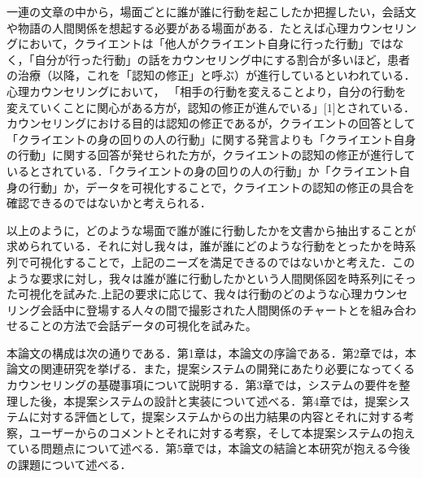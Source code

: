 \documentclass[shuuron]{kuee}
\begin{document}
一連の文章の中から，場面ごとに誰が誰に行動を起こしたか把握したい，会話文や物語の人間関係を想起する必要がある場面がある．たとえば心理カウンセリングにおいて，クライエントは「他人がクライエント自身に行った行動」ではなく，「自分が行った行動」の話をカウンセリング中にする割合が多いほど，患者の治療（以降，これを「認知の修正」と呼ぶ）が進行しているといわれている．心理カウンセリングにおいて， 「相手の行動を変えることより，自分の行動を変えていくことに関心がある方が，認知の修正が進んでいる」[1]とされている．カウンセリングにおける目的は認知の修正であるが，クライエントの回答として「クライエントの身の回りの人の行動」に関する発言よりも「クライエント自身の行動」に関する回答が発せられた方が，クライエントの認知の修正が進行しているとされている．「クライエントの身の回りの人の行動」か「クライエント自身の行動」か，データを可視化することで，クライエントの認知の修正の具合を確認できるのではないかと考えられる．

以上のように，どのような場面で誰が誰に行動したかを文書から抽出することが求められている．それに対し我々は，誰が誰にどのような行動をとったかを時系列で可視化することで，上記のニーズを満足できるのではないかと考えた．このような要求に対し，我々は誰が誰に行動したかという人間関係図を時系列にそった可視化を試みた.上記の要求に応じて、我々は行動のどのような心理カウンセリング会話中に登場する人々の間で撮影された人間関係のチャートとを組み合わせることの方法で会話データの可視化を試みた。

本論文の構成は次の通りである．第1章は，本論文の序論である．第2章では，本論文の関連研究を挙げる．また，提案システムの開発にあたり必要になってくるカウンセリングの基礎事項について説明する．第3章では，システムの要件を整理した後，本提案システムの設計と実装について述べる．第4章では，提案システムに対する評価として，提案システムからの出力結果の内容とそれに対する考察，ユーザーからのコメントとそれに対する考察，そして本提案システムの抱えている問題点について述べる．第5章では，本論文の結論と本研究が抱える今後の課題について述べる．

%
\end{document}
